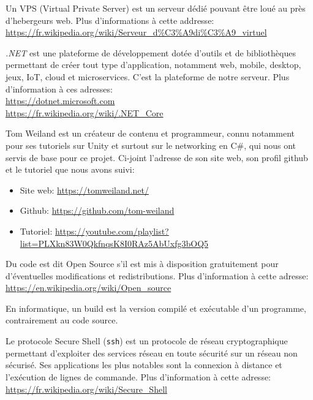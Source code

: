 \documentclass[a4paper]{article}
\begin{document}
\newpage
\begin{thebibliography}{}
	Un VPS (Virtual Private Server) est un serveur dédié pouvant être loué au près d'hebergeurs web. Plus d'informations à cette addresse: \\
    \url{https://fr.wikipedia.org/wiki/Serveur_d\%C3\%A9di\%C3\%A9_virtuel}

	\textit{.NET} est une plateforme de développement dotée d'outils et de bibliothèques permettant de créer tout type d'application, notamment web, mobile, desktop, jeux, IoT, cloud et microservices. C'est la plateforme de notre serveur. Plus d'information à ces adresses: \\ 
    \url{https://dotnet.microsoft.com} \\
    \url{https://fr.wikipedia.org/wiki/.NET_Core}

	Tom Weiland est un créateur de contenu et programmeur, connu notamment pour ses tutoriels sur Unity et surtout sur le networking en C\#, qui nous ont servis de base pour ce projet. Ci-joint l'adresse de son site web, son profil github et le tutoriel que nous avons suivi:
    \begin{itemize}
    	\item Site web: \url{https://tomweiland.net/}
        \item Github: \url{https://github.com/tom-weiland}
        \item Tutoriel: \url{https://youtube.com/playlist?list=PLXkn83W0QkfnqsK8I0RAz5AbUxfg3bOQ5}
    \end{itemize}

	Du code est dit Open Source s'il est mis à disposition gratuitement pour d'éventuelles modifications et redistributions. Plus d'information à cette adresse: \\ 
    \url{https://en.wikipedia.org/wiki/Open_source}
    
    En informatique, un build est la version compilé et exécutable d'un programme, contrairement au code source.

	Le protocole Secure Shell (\texttt{ssh}) est un protocole de réseau cryptographique permettant d'exploiter des services réseau en toute sécurité sur un réseau non sécurisé. Ses applications les plus notables sont la connexion à distance et l'exécution de lignes de commande. Plus d'information à cette adresse: \\
    \url{https://fr.wikipedia.org/wiki/Secure_Shell}
    

\end{thebibliography}
\end{document}

